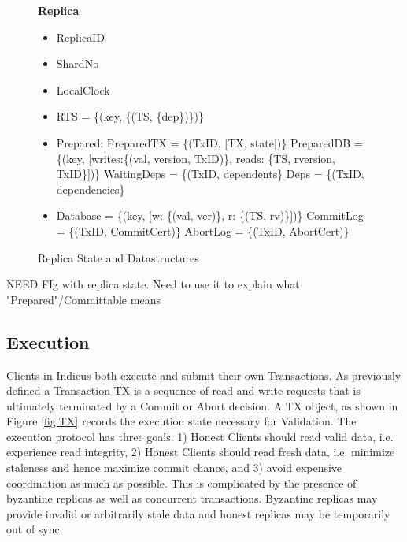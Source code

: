 \newcommand{\SubItem}[1]{
    {\setlength\itemindent{15pt} \item[-] #1}
}

\begin{figure}[t]
  \begin{mdframed}[roundcorner=10pt]
 	\textbf{Replica }
 	\begin{itemize}
 	\item ReplicaID
 	\item ShardNo
 	\item LocalClock
 	\item RTS = \{(key, \{(TS, \{dep\})\})\}
 	\item Prepared:
 	\subitem PreparedTX = \{(TxID, [TX, state])\}
 	\subitem PreparedDB = \{(key, [writes:\{(val, version, TxID)\},  reads: \{TS, rversion, TxID\}])\}
 	\subitem WaitingDeps = \{(TxID, dependents\}
 	\subitem Deps = \{(TxID, dependencies\}
 	\item Database = \{(key, [w: \{(val, ver)\}, r: \{(TS, rv)\}])\}
 	\subitem CommitLog = \{(TxID, CommitCert)\}
 	\subitem AbortLog = \{(TxID, AbortCert)\}
	 	
 	
 	\end{itemize}
  \end{mdframed}
  \caption{Replica State and Datastructures}
  \label{fig:RS}
\end{figure}

NEED FIg with replica state. Need to use it to explain what "Prepared"/Committable means
\subsection{Execution}
Clients in Indicus both execute and submit their own Transactions. As previously defined a Transaction TX is a sequence of read and write requests that is ultimately terminated by a Commit or Abort decision. A TX object, as shown in Figure \ref{fig:TX} records the execution state necessary for Validation. The execution protocol has three goals: 1) Honest Clients should read valid data, i.e. experience read integrity, 2) Honest Clients should read fresh data, i.e. minimize staleness and hence maximize commit chance, and 3) avoid expensive coordination as much as possible. This is complicated by the presence of byzantine replicas as well as concurrent transactions. Byzantine replicas may provide invalid or arbitrarily stale data and honest replicas may be temporarily out of sync.

